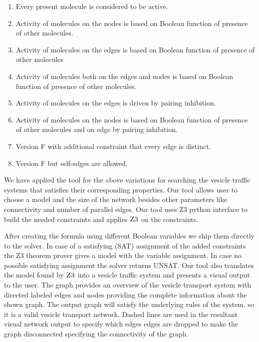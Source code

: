 \begin{enumerate}[label=\Alph*]
\item Every present molecule is considered to be active.
\item Activity of molecules on the nodes is based on Boolean function of presence of other molecules. 
\item Activity of molecules on the edges is based on Boolean function of presence of other molecules
\item Activity of molecules both on the edges and nodes is based on Boolean function of presence of other molecules.
\item Activity of molecules on the edges is driven by pairing inhibition.
\item Activity of molecules on the nodes is based on Boolean function of presence of other molecules and on edge by pairing inhibition.
\item Version F with additional constraint that every edge is distinct.
\item Version F but self-edges are allowed.
\end{enumerate}
%
We have applied the tool for the above variations for searching the vesicle traffic systems that satisfies
their corresponding properties. Our tool allows user to choose a model and the size of the network besides other parameters like connectivity and number of parallel edges. Our tool uses Z3 python interface to build the needed constraints and applies $\textsc{Z3}$ on the constraints.

After creating the formula using different Boolean variables we ship them directly to the solver. In case of a satisfying (SAT) assignment of the added constraints the Z3 theorem prover gives a model with the variable assignment. In case no possible satisfying assignment the solver returns UNSAT.
%
Our tool also translates the model found by $\textsc{Z3}$ into a vesicle traffic system and presents a visual
output to the user. The graph provides an overview of the vesicle transport system with directed labeled edges and nodes providing the complete information about the shown graph. The output graph will satisfy the underlying rules of the system, so it is a valid vesicle transport network. Dashed lines are used in the resultant visual network output to specify which edges edges are dropped to make the graph disconnected specifying the connectivity of the graph.

